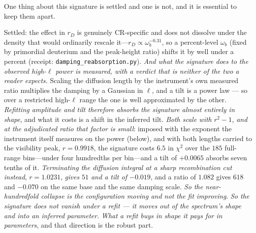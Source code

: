 \documentclass[11pt,a4paper]{article}
\theoremstyle{plain}
\theoremstyle{definition}
\theoremstyle{remark}
\begin{document}
One thing about this signature is settled and one is not, and it is essential to keep them apart. 

Settled: the effect in $r_D$ is genuinely CR-specific and does not dissolve under the density that would ordinarily rescale it---$r_D\propto\omega_b^{-0.31}$, so a percent-level $\omega_b$ (fixed by primordial deuterium and the peak-height ratio) shifts it by well under a percent (receipt: \texttt{damping\_reabsorption.py}). \emph{And what the signature does to the observed high-$\ell$ power is measured, with a verdict that is
neither of the two a reader expects.} Scaling the diffusion length by the instrument's own measured ratio
multiplies the damping by a Gaussian in $\ell$, and a tilt is a power law --- so over a restricted high-$\ell$
range the one is well approximated by the other. \emph{Refitting amplitude and tilt therefore absorbs the
signature almost entirely in shape}, and what it costs is a shift in the inferred tilt. \emph{Both scale with
$r^{2}-1$, and at the adjudicated ratio that factor is small}: imposed with the exponent the instrument itself
measures on the power (below), and with both lengths carried to the visibility peak, $r=0.9918$, the signature
costs $6.5$ in $\chi^{2}$ over the $185$ full-range bins---under four hundredths per bin---and a tilt of
$+0.0065$ absorbs seven tenths of it. \emph{Terminating the diffusion integral at a
sharp recombination cut instead}, $r=1.0231$, \emph{gives $51$ and a tilt of $-0.019$}, and a ratio of $1.082$ gives $618$ and $-0.070$ on the same base and the same damping scale. \emph{So the
near-hundredfold collapse is the configuration moving and not the fit improving}. \emph{So the signature
does not vanish under a refit --- it moves out of the spectrum's shape and into an inferred parameter.}
\emph{What a refit buys in shape it pays for in parameters}, and that direction is the robust part.
\end{document}
